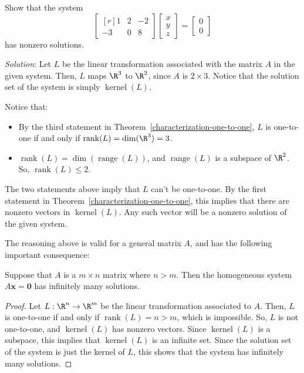 \documentclass[12pt]{article}
\DeclareMathOperator{\range}{range}
\DeclareMathOperator{\rank}{rank}
\DeclareMathOperator{\kernel}{kernel}
\begin{document}
\begin{example} Show that the system
\[
\begin{bmatrix*}[r]1&2&-2\\-3&0&8\end{bmatrix*}
\begin{bmatrix}x\\y\\z\end{bmatrix}=
\begin{bmatrix}0\\0\end{bmatrix}
\]
has nonzero solutions.

\emph{Solution}: Let $L$ be the linear transformation associated with the matrix $A$ in the given system. Then, $L$ maps $\R^3$ to $\R^2$, since $A$ is $2\times3$. Notice that the solution set of the system is simply $\kernel(L)$.

Notice that:
\begin{itemize}
\item By the third statement in Theorem~\ref{characterization-one-to-one}, $L$ is one-to-one if and only if $\rank(L)=\dim(\R^3)=3$.
\item $\rank(L)=\dim(\range(L))$, and $\range(L)$ is a subspace of $\R^2$. So, $\rank(L)\le 2$.
\end{itemize}
The two statements above imply that $L$ can't be one-to-one. By the first statement in Theorem~\ref{characterization-one-to-one}, this implies that there are nonzero vectors in $\kernel(L)$. Any such vector will be a nonzero solution of the given system.
\end{example}

The reasoning above is valid for a general matrix $A$, and has the following important consequence:

\begin{theorem} Suppose that $A$ is a $m\times n$ matrix where $n>m$. Then the homogeneous system $A\mathbf{x}=\mathbf{0}$ has infinitely many solutions.
\end{theorem}

\begin{proof} Let $L:\R^n\to\R^m$ be the linear transformation associated to $A$. Then, $L$ is one-to-one if and only if $\rank(L)=n>m$, which is impossible. So, $L$ is not one-to-one, and $\kernel(L)$ has nonzero vectors. Since $\kernel(L)$ is a subspace, this implies that $\kernel(L)$ is an infinite set. Since the solution set of the system is just the kernel of $L$, this shows that the system has infinitely many solutions.
\end{proof}
\end{document}
